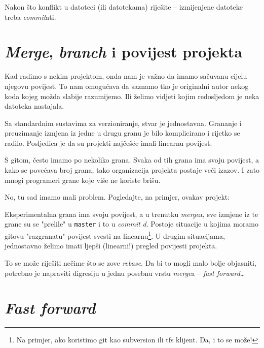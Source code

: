 
Nakon što konflikt u datoteci (ili datotekama) riješite -- izmijenjene datoteke treba \emph{commit}ati.

\section*{\emph{Merge}, \emph{branch} i povijest projekta}

Kad radimo s nekim projektom, onda nam je važno da imamo sačuvanu cijelu njegovu povijest.
To nam omogućava da saznamo tko je originalni autor nekog koda kojeg možda slabije razumijemo.
Ili želimo vidjeti kojim redosljedom je neka datoteka nastajala.

Sa standardnim sustavima za verzioniranje, stvar je jednostavna. 
Grananje i preuzimanje izmjena iz jedne u drugu granu je bilo komplicirano i rijetko se radilo. 
Posljedica je da su projekti najčešće imali linearnu povijest.



S gitom, često imamo po nekoliko grana.
Svaka od tih grana ima svoju povijest, a kako se povećava broj grana, tako organizacija projekta postaje veći izazov.
I zato mnogi programeri grane koje više ne koriste brišu.

No, tu sad imamo mali problem.
Pogledajte, na primjer, ovakav projekt:



Eksperimentalna grana ima svoju povijest, a u trenutku \emph{merge}a, sve izmjene iz te grane su se "prelile" u \verb+master+ i to u \emph{commit} \emph d.
Postoje situacije u kojima moramo gitovu "razgranatu" povijest svesti na linearnu\footnote{Na primjer, ako koristimo git kao subversion ili tfs klijent. Da, i to se može!}.
U drugim situacijama, jednostavno želimo imati ljepši (linearni!) pregled povijesti projekta.

To se može riješiti nečime što se zove \emph{rebase}.
Da bi to mogli malo bolje objasniti, potrebno je napraviti digresiju u jednu posebnu vrstu \emph{merge}a -- \emph{fast forward}\dots

\section*{\emph{Fast forward}}

